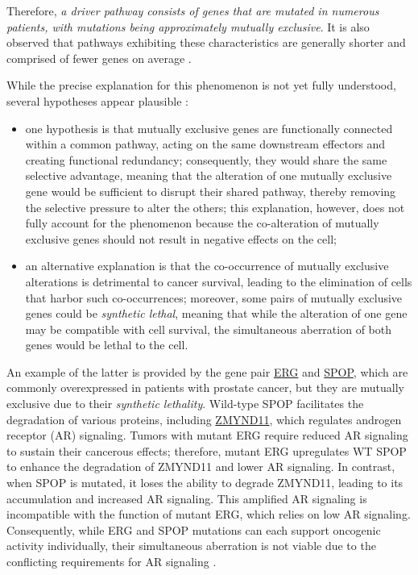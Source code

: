 Therefore, \textit{a driver pathway consists of genes that are mutated in numerous patients, with mutations being approximately mutually exclusive}. It is also observed that pathways exhibiting these characteristics are generally shorter and comprised of fewer genes on average \cite{multi-dendrix}.

While the precise explanation for this phenomenon is not yet fully understood, several hypotheses appear plausible \cite{survey, mutual_exclusivity_expls, dendrix}:

\begin{itemize}
    \item one hypothesis is that mutually exclusive genes are functionally connected within a common pathway, acting on the same downstream effectors and creating functional redundancy; consequently, they would share the same selective advantage, meaning that the alteration of one mutually exclusive gene would be sufficient to disrupt their shared pathway, thereby removing the selective pressure to alter the others; this explanation, however, does not fully account for the phenomenon because the co-alteration of mutually exclusive genes should not result in negative effects on the cell;
    \item an alternative explanation is that the co-occurrence of mutually exclusive alterations is detrimental to cancer survival, leading to the elimination of cells that harbor such co-occurrences; moreover, some pairs of mutually exclusive genes could be \textit{synthetic lethal}, meaning that while the alteration of one gene may be compatible with cell survival, the simultaneous aberration of both genes would be lethal to the cell.
\end{itemize}

An example of the latter is provided by the gene pair \href{https://en.wikipedia.org/wiki/ERG_(gene)}{ERG} and \href{https://en.wikipedia.org/wiki/SPOP}{SPOP}, which are commonly overexpressed in patients with prostate cancer, but they are mutually exclusive due to their \textit{synthetic lethality}. Wild-type SPOP facilitates the degradation of various proteins, including \href{https://en.wikipedia.org/wiki/ZMYND11Jjla}{ZMYND11}, which regulates androgen receptor (AR) signaling. Tumors with mutant ERG require reduced AR signaling to sustain their cancerous effects; therefore, mutant ERG upregulates WT SPOP to enhance the degradation of ZMYND11 and lower AR signaling. In contrast, when SPOP is mutated, it loses the ability to degrade ZMYND11, leading to its accumulation and increased AR signaling. This amplified AR signaling is incompatible with the function of mutant ERG, which relies on low AR signaling. Consequently, while ERG and SPOP mutations can each support oncogenic activity individually, their simultaneous aberration is not viable due to the conflicting requirements for AR signaling \cite{erg_spop}.

